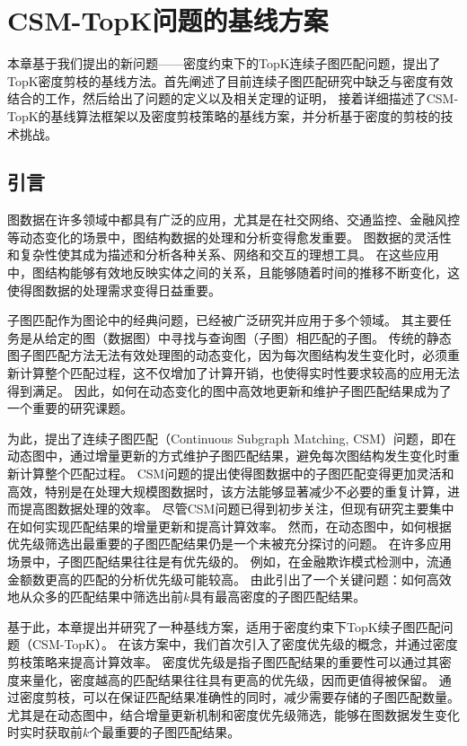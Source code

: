 \chapter{ CSM-TopK问题的基线方案}
\label{ch3}
本章基于我们提出的新问题——密度约束下的TopK连续子图匹配问题，提出了TopK密度剪枝的基线方法。首先阐述了目前连续子图匹配研究中缺乏与密度有效结合的工作，然后给出了问题的定义以及相关定理的证明，
接着详细描述了CSM-TopK的基线算法框架以及密度剪枝策略的基线方案，并分析基于密度的剪枝的技术挑战。
\section{引言}
\label{ch3:introduction}
图数据在许多领域中都具有广泛的应用，尤其是在社交网络、交通监控、金融风控等动态变化的场景中，图结构数据的处理和分析变得愈发重要。
图数据的灵活性和复杂性使其成为描述和分析各种关系、网络和交互的理想工具。
在这些应用中，图结构能够有效地反映实体之间的关系，且能够随着时间的推移不断变化，这使得图数据的处理需求变得日益重要。

子图匹配作为图论中的经典问题，已经被广泛研究并应用于多个领域。
其主要任务是从给定的图（数据图）中寻找与查询图（子图）相匹配的子图。
传统的静态图子图匹配方法无法有效处理图的动态变化，因为每次图结构发生变化时，必须重新计算整个匹配过程，这不仅增加了计算开销，也使得实时性要求较高的应用无法得到满足。
因此，如何在动态变化的图中高效地更新和维护子图匹配结果成为了一个重要的研究课题。

为此，提出了连续子图匹配（Continuous Subgraph Matching, CSM）问题，即在动态图中，通过增量更新的方式维护子图匹配结果，避免每次图结构发生变化时重新计算整个匹配过程。
CSM问题的提出使得图数据中的子图匹配变得更加灵活和高效，特别是在处理大规模图数据时，该方法能够显著减少不必要的重复计算，进而提高图数据处理的效率。
尽管CSM问题已得到初步关注，但现有研究主要集中在如何实现匹配结果的增量更新和提高计算效率。
然而，在动态图中，如何根据优先级筛选出最重要的子图匹配结果仍是一个未被充分探讨的问题。
在许多应用场景中，子图匹配结果往往是有优先级的。
例如，在金融欺诈模式检测中，流通金额数更高的匹配的分析优先级可能较高。
由此引出了一个关键问题：如何高效地从众多的匹配结果中筛选出前$k$具有最高密度的子图匹配结果。

基于此，本章提出并研究了一种基线方案，适用于密度约束下TopK续子图匹配问题（CSM-TopK）。
在该方案中，我们首次引入了密度优先级的概念，并通过密度剪枝策略来提高计算效率。
密度优先级是指子图匹配结果的重要性可以通过其密度来量化，密度越高的匹配结果往往具有更高的优先级，因而更值得被保留。
通过密度剪枝，可以在保证匹配结果准确性的同时，减少需要存储的子图匹配数量。
尤其是在动态图中，结合增量更新机制和密度优先级筛选，能够在图数据发生变化时实时获取前$k$个最重要的子图匹配结果。
